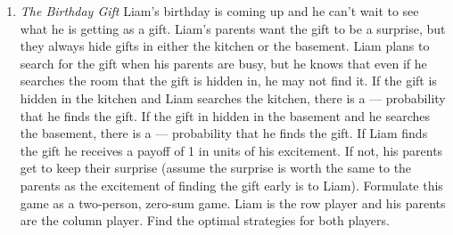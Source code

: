 \begin{enumerate}
\item \emph{The Birthday Gift}
Liam's birthday is coming up and he can't wait to see what he is getting as a gift. Liam's parents want the gift to be a surprise, but they always hide gifts in either the kitchen or the basement. Liam plans to search for the gift when his parents are busy, but he knows that even if he searches the room that the gift is hidden in, he may not find it. If the gift is hidden in the kitchen and Liam searches the kitchen, there is a --- probability that he finds the gift. If the gift in hidden in the basement and he searches the basement, there is a --- probability that he finds the gift. If Liam finds the gift he receives a payoff of 1 in units of his excitement. If not, his parents get to keep their surprise (assume the surprise is worth the same to the parents as the excitement of finding the gift early is to Liam). 
Formulate this game as a two-person, zero-sum game. Liam is the row player and his parents are the column player. Find the optimal strategies for both players. \label{sda}

\end{enumerate}
